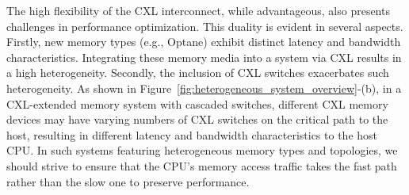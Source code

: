 
The high flexibility of the CXL interconnect, while advantageous, also presents challenges in performance optimization. This duality is evident in several aspects. 
Firstly, new memory types (e.g., Optane) exhibit distinct latency and bandwidth characteristics. Integrating these  memory media into a system via CXL results in a high heterogeneity.
Secondly, the inclusion of CXL switches exacerbates such heterogeneity. 
As shown in Figure~\ref{fig:heterogeneous_system_overview}-(b), in a CXL-extended memory system with cascaded switches, different CXL memory devices may have varying numbers of CXL switches on the critical path to the host, resulting in different latency and bandwidth characteristics to the host CPU. In such systems featuring  heterogeneous memory types and topologies, we should strive to ensure that the CPU's memory access traffic takes the fast path rather than the slow one to preserve performance.

